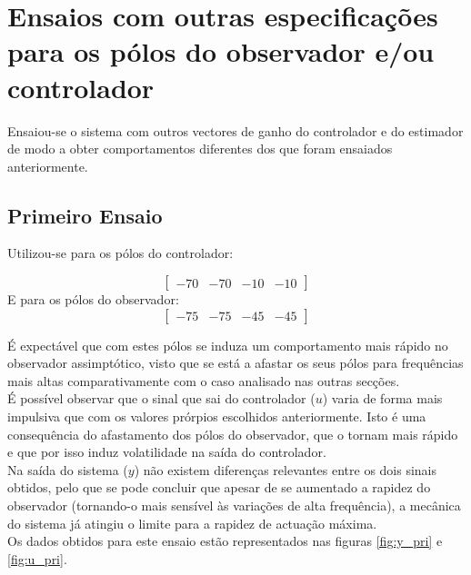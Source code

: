 \documentclass[%
  reprint,
  nofootinbib,
  amsmath,amssymb,
  aps,
  10pt,
  a4paper
]{revtex4-1}
\begin{document}
\section{Ensaios com outras especificações para os pólos do observador e/ou controlador}
Ensaiou-se o sistema com outros vectores de ganho do controlador e do estimador de modo a obter comportamentos diferentes dos que foram ensaiados anteriormente.\\

\subsection{Primeiro Ensaio}

Utilizou-se para os pólos do controlador:

\begin{equation}
\begin{bmatrix}
-70 & -70  & -10 &-10
\end{bmatrix}
\end{equation}
E para os pólos do observador:
\begin{equation}
\begin{bmatrix}
-75 & -75  & -45 &-45
\end{bmatrix}
\end{equation}

É expectável que com estes pólos se induza um comportamento mais rápido no observador assimptótico, visto que se está a afastar os seus pólos para frequências mais altas comparativamente com o caso analisado nas outras secções.\\
É possível observar que o sinal que sai do controlador ($u$) varia de forma mais impulsiva que com os valores prórpios escolhidos anteriormente. Isto é uma consequência do afastamento dos pólos do observador, que o tornam mais rápido e que por isso induz volatilidade na saída do controlador.\\

Na saída do sistema ($y$) não existem diferenças relevantes entre os dois sinais obtidos, pelo que se pode concluir que apesar de se aumentado a rapidez do observador (tornando-o mais sensível às variações de alta frequência), a mecânica do sistema já atingiu o limite para a rapidez de actuação máxima.\\

Os dados obtidos para este ensaio estão representados nas figuras \ref{fig:y_pri} e \ref{fig:u_pri}.
\end{document}
